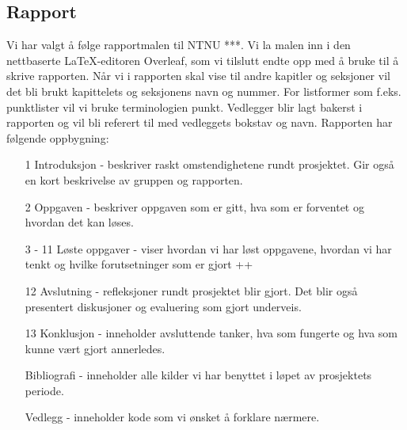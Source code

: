 \subsection{Rapport}
Vi har valgt å følge rapportmalen til NTNU ***. Vi la malen inn i den nettbaserte LaTeX-editoren Overleaf, som vi tilslutt endte opp med å bruke til å skrive rapporten. Når vi i rapporten skal vise til andre kapitler og seksjoner vil det bli brukt kapittelets og seksjonens navn og nummer. For listformer som f.eks. punktlister vil vi bruke terminologien punkt. Vedlegger blir lagt bakerst i rapporten og vil bli referert til med vedleggets bokstav og navn. Rapporten har følgende oppbygning:
\begin{itemize}
  \item[1] Introduksjon - beskriver raskt omstendighetene rundt prosjektet. Gir også en kort beskrivelse av gruppen og rapporten.
  \item[2] Oppgaven - beskriver oppgaven som er gitt, hva som er forventet og hvordan det kan løses.
  \item[3 - 11] Løste oppgaver - viser hvordan vi har løst oppgavene, hvordan vi har tenkt og hvilke forutsetninger som er gjort
 ++  \item[12] Avslutning - refleksjoner rundt prosjektet blir gjort. Det blir også presentert diskusjoner og evaluering som gjort underveis.
  \item[13] Konklusjon - inneholder avsluttende tanker, hva som fungerte og hva som kunne vært gjort annerledes.
  \item[] Bibliografi - inneholder alle kilder vi har benyttet i løpet av prosjektets periode.
  \item[] Vedlegg - inneholder kode som vi ønsket å forklare nærmere.
\end{itemize}
